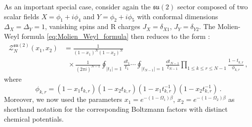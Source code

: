 \documentclass[a4paper,11pt]{article}
\DeclareMathOperator{\phaneq}{\phantom{{}=}}
\begin{document}
As an important special case, consider again the $\mathfrak{su}(2)$ sector composed of two scalar fields $X=\phi_1+i\phi_4$ and $Y=\phi_2+i\phi_5$ with conformal dimensions $\Delta_X=\Delta_Y=1$, vanishing spins and R charges $J_X=\delta_{X1}$, $J_Y=\delta_{Y2}$. The Molien-Weyl formula \eqref{eq:Molien_Weyl_formula} then reduces to the form \cite{teranishi1986,teranishi1987,dhokovic2007}:
% 
\begin{equation} \label{eq:Molien_Weyl_su(2)}
\begin{aligned}
	\mathcal{Z}_N^{\mathfrak{su}(2)}(x_1,x_2) &= \frac{1}{(1-x_1)^N(1-x_2)^N} \\& \phaneq \times\frac{1}{(2\pi i)^{N-1}} \oint_{|t_1|=1} \frac{\dd t_1}{t_1} \cdots \oint_{|t_{N-1}|=1} \frac{\dd t_{N-1}}{t_{N-1}}  \prod_{1\leq k\leq r\leq N-1} \frac{1-t_{k,r}}{\phi_{k,r}} \, ,
\end{aligned}
\end{equation}
% 
where
% 
\begin{equation}
	\phi_{k,r} = (1-x_1t_{k,r})(1-x_2t_{k,r})(1-x_1t_{k,r}^{-1})(1-x_2t_{k,r}^{-1}) \ .
\end{equation}
% 
Moreover, we now used the parameters $x_1=e^{-(1-\Omega_1)\beta}$, $x_2=e^{-(1-\Omega_2)\beta}$ as shorthand notation for the corresponding Boltzmann factors with distinct chemical potentials.
\end{document}
